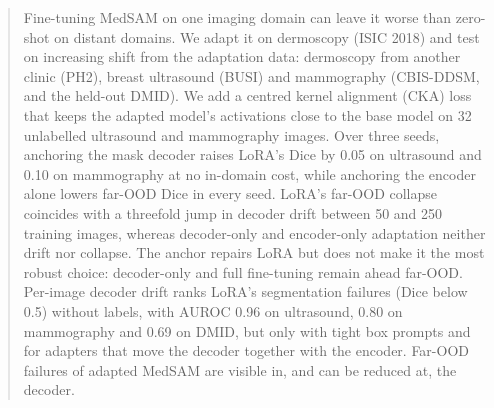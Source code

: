\begin{abstract}
Fine-tuning MedSAM on one imaging domain can leave it worse than zero-shot on distant domains. We adapt it on dermoscopy (ISIC 2018) and test on increasing shift from the adaptation data: dermoscopy from another clinic (PH2), breast ultrasound (BUSI) and mammography (CBIS-DDSM, and the held-out DMID). We add a centred kernel alignment (CKA) loss that keeps the adapted model's activations close to the base model on 32 unlabelled ultrasound and mammography images. Over three seeds, anchoring the mask decoder raises LoRA's Dice by 0.05 on ultrasound and 0.10 on mammography at no in-domain cost, while anchoring the encoder alone lowers far-OOD Dice in every seed. LoRA's far-OOD collapse coincides with a threefold jump in decoder drift between 50 and 250 training images, whereas decoder-only and encoder-only adaptation neither drift nor collapse. The anchor repairs LoRA but does not make it the most robust choice: decoder-only and full fine-tuning remain ahead far-OOD. Per-image decoder drift ranks LoRA's segmentation failures (Dice below 0.5) without labels, with AUROC 0.96 on ultrasound, 0.80 on mammography and 0.69 on DMID, but only with tight box prompts and for adapters that move the decoder together with the encoder. Far-OOD failures of adapted MedSAM are visible in, and can be reduced at, the decoder.
\end{abstract}
